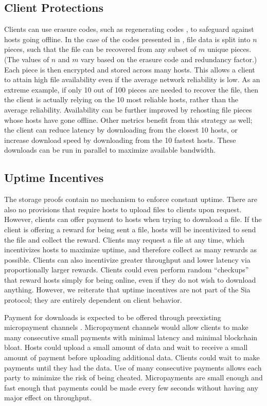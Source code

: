 \documentclass[twocolumn]{article}
\begin{document}
\subsection{Client Protections}
Clients can use erasure codes, such as regenerating codes \cite{reg}, to safeguard against hosts going offline.
In the case of the codes presented in \cite{reg}, file data is split into $n$ pieces, such that the file can be recovered from any subset of $m$ unique pieces.
(The values of $n$ and $m$ vary based on the erasure code and redundancy factor.)
Each piece is then encrypted and stored across many hosts.
This allows a client to attain high file availability even if the average network reliability is low.
As an extreme example, if only 10 out of 100 pieces are needed to recover the file, then the client is actually relying on the 10 most reliable hosts, rather than the average reliability.
Availability can be further improved by rehosting file pieces whose hosts have gone offline.
Other metrics benefit from this strategy as well; the client can reduce latency by downloading from the closest 10 hosts, or increase download speed by downloading from the 10 fastest hosts.
These downloads can be run in parallel to maximize available bandwidth.

\subsection{Uptime Incentives}
\label{sec:uptime}
The storage proofs contain no mechanism to enforce constant uptime.
There are also no provisions that require hosts to upload files to clients upon request.
However, clients can offer payment to hosts when trying to download a file.
If the client is offering a reward for being sent a file, hosts will be incentivized to send the file and collect the reward.
Clients may request a file at any time, which incentivizes hosts to maximize uptime, and therefore collect as many rewards as possible.
Clients can also incentivize greater throughput and lower latency via proportionally larger rewards.
Clients could even perform random ``checkups'' that reward hosts simply for being online, even if they do not wish to download anything.
However, we reiterate that uptime incentives are not part of the Sia protocol; they are entirely dependent on client behavior.

Payment for downloads is expected to be offered through preexisting micropayment channels \cite{mpc}.
Micropayment channels would allow clients to make many consecutive small payments with minimal latency and minimal blockchain bloat.
Hosts could upload a small amount of data and wait to receive a small amount of payment before uploading additional data.
Clients could wait to make payments until they had the data.
Use of many consecutive payments allows each party to minimize the risk of being cheated.
Micropayments are small enough and fast enough that payments could be made every few seconds without having any major effect on throughput.
\end{document}
